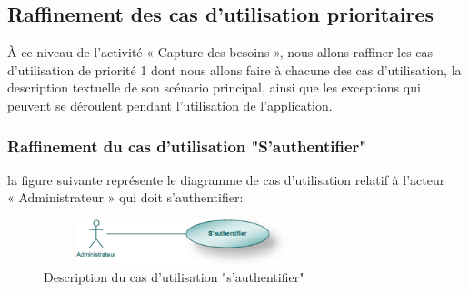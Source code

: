 \documentclass[12 pt ]{report}
\begin{document}
\subsection{Raffinement des cas d’utilisation prioritaires}
À ce niveau de l’activité « Capture des besoins », nous allons raffiner les cas d'utilisation de priorité 1 dont nous allons faire à chacune des cas d'utilisation, la description textuelle de son scénario principal, ainsi que les exceptions qui peuvent se déroulent pendant l'utilisation de l’application.




\subsubsection{Raffinement du cas d'utilisation "S'authentifier"}
la figure suivante représente le diagramme de cas d’utilisation  relatif à l’acteur \\« Administrateur » qui doit s'authentifier:
\begin{figure}[h]
\begin{center}
\includegraphics[width= 8cm , height = 1.3cm]{auth.png}
\caption{Description du cas d'utilisation "s'authentifier"}
\end{center}
\end{figure}
\end{document}
